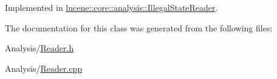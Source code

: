 Implemented in \mbox{\hyperlink{classlucene_1_1core_1_1analysis_1_1IllegalStateReader_aa2a34d98ca51e81297960b13aa0fa18e}{lucene\+::core\+::analysis\+::\+Illegal\+State\+Reader}}.



The documentation for this class was generated from the following files\+:\begin{DoxyCompactItemize}
\item 
Analysis/\mbox{\hyperlink{Reader_8h}{Reader.\+h}}\item 
Analysis/\mbox{\hyperlink{Reader_8cpp}{Reader.\+cpp}}\end{DoxyCompactItemize}
